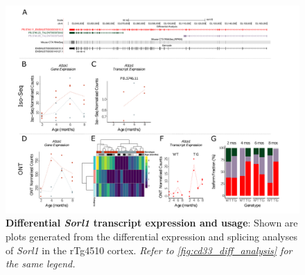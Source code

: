 \begin{landscape}
	\begin{figure}[htp]
		\begin{center}
			\includegraphics[page=16,trim={0 0.5cm 0 1.5cm},scale =0.85]{Figures/TargetGene_DifferentialAnalysis.pdf}
		\end{center}
		\captionsetup{width=1.5\textwidth}
		\caption[Differential \textit{Sorl1} transcript expression and usage]%
		{\textbf{Differential \textit{Sorl1} transcript expression and usage}: Shown are plots generated from the differential expression and splicing analyses of \textit{Sorl1} in the rTg4510 cortex. \textit{Refer to \cref{fig:cd33_diff_analysis} for the same legend.}}   
		\label{fig:Sorl1_diff_analysis}
	\end{figure}
\end{landscape}

